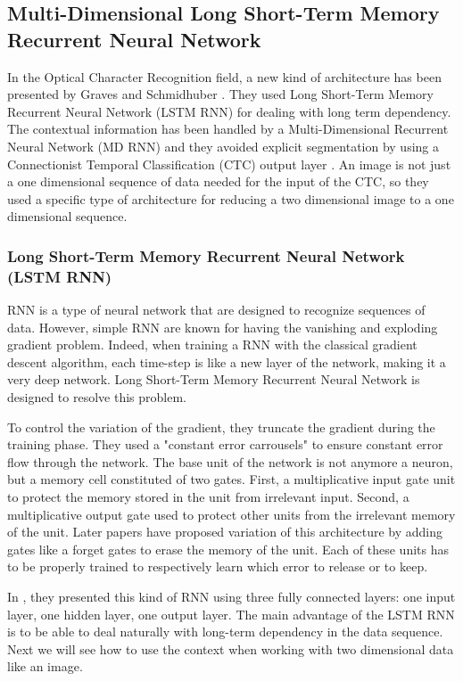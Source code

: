 \documentclass[11pt]{sdm}
\begin{document}
\subsection{Multi-Dimensional Long Short-Term Memory Recurrent Neural Network}

In the Optical Character Recognition field, a new kind of architecture has been presented by Graves and Schmidhuber \cite{graves_offline_2009}.
They used Long Short-Term Memory Recurrent Neural Network (LSTM RNN) \cite{hochreiter_long_1997} for dealing with long term dependency.
The contextual information has been handled by a Multi-Dimensional Recurrent Neural Network (MD RNN) and they avoided explicit segmentation by using a Connectionist Temporal Classification (CTC) output layer \cite{graves_connectionist_2006}.
An image is not just a one dimensional sequence of data needed for the input of the CTC, so they used a specific type of architecture for reducing a two dimensional image to a one dimensional sequence.

\subsubsection{Long Short-Term Memory Recurrent Neural Network (LSTM RNN)}

RNN is a type of neural network that are designed to recognize sequences of data.
However, simple RNN are known for having the vanishing and exploding gradient problem.
Indeed, when training a RNN with the classical gradient descent algorithm, each time-step is like a new layer of the network, making it a very deep network.
Long Short-Term Memory Recurrent Neural Network is designed to resolve this problem.

To control the variation of the gradient, they truncate the gradient during the training phase.
They used a "constant error carrousels" to ensure constant error flow through the network.
The base unit of the network is not anymore a neuron, but a memory cell constituted of two gates.
First, a multiplicative input gate unit to protect the memory stored in the unit from irrelevant input.
Second, a multiplicative output gate used to protect other units from the irrelevant memory of the unit.
Later papers have proposed variation of this architecture by adding gates like a forget gates to erase the memory of the unit.
Each of these units has to be properly trained to respectively learn which error to release or to keep.

In \cite{hochreiter_long_1997}, they presented this kind of RNN using three fully connected layers: one input layer, one hidden layer, one output layer.
The main advantage of the LSTM RNN is to be able to deal naturally with long-term dependency in the data sequence.
Next we will see how to use the context when working with two dimensional data like an image.
\end{document}
